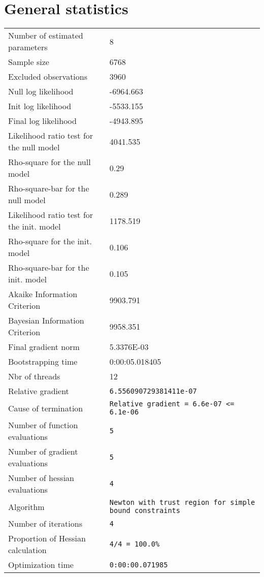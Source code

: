 \section{General statistics}
\begin{tabular}{ll}
Number of estimated parameters & 8 \\
Sample size & 6768 \\
Excluded observations & 3960 \\
Null log likelihood & -6964.663 \\
Init log likelihood & -5533.155 \\
Final log likelihood & -4943.895 \\
Likelihood ratio test for the null model & 4041.535 \\
Rho-square for the null model & 0.29 \\
Rho-square-bar for the null model & 0.289 \\
Likelihood ratio test for the init. model & 1178.519 \\
Rho-square for the init. model & 0.106 \\
Rho-square-bar for the init. model & 0.105 \\
Akaike Information Criterion & 9903.791 \\
Bayesian Information Criterion & 9958.351 \\
Final gradient norm & 5.3376E-03 \\
Bootstrapping time & 0:00:05.018405 \\
Nbr of threads & 12 \\
Relative gradient & \verb$6.556090729381411e-07$ \\
Cause of termination & \verb$Relative gradient = 6.6e-07 <= 6.1e-06$ \\
Number of function evaluations & \verb$5$ \\
Number of gradient evaluations & \verb$5$ \\
Number of hessian evaluations & \verb$4$ \\
Algorithm & \verb$Newton with trust region for simple bound constraints$ \\
Number of iterations & \verb$4$ \\
Proportion of Hessian calculation & \verb$4/4 = 100.0%$ \\
Optimization time & \verb$0:00:00.071985$ \\
\end{tabular}

